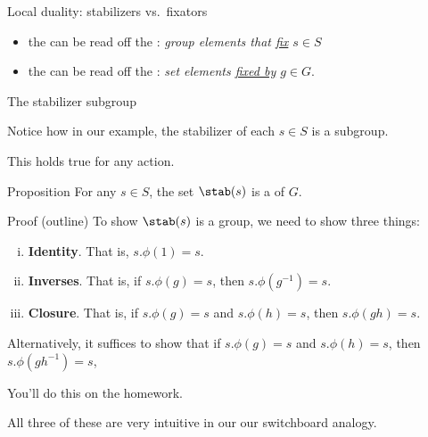 \documentclass[8pt, handout]{beamer}
\newcommand{\Pause}{}      %
\begin{document}
\begin{frame}{Local duality: stabilizers vs.\ fixators}
  \Pause
  
  \begin{itemize}
  \item the  can be read off the :
    \emph{group elements that \underline{fix} $s\in
      S$} \smallskip\Pause
  \item the  can be read off the :
    \emph{set elements \underline{fixed by} $g\in G$}.
  \end{itemize}
  
\end{frame}


\begin{frame}{The stabilizer subgroup} 

  Notice how in our example, the stabilizer of each $s\in S$ is a subgroup. 

  \medskip\Pause

  This holds true for any action. 
  
  \smallskip\Pause
  
  \begin{block}{Proposition}
    For any $s\in S$, the set $\stab(s)$ is a  of $G$.
  \end{block}

  \Pause

  \begin{exampleblock}{Proof (outline)} %
    To show $\stab(s)$ is a group, we need to show three things: \Pause \\
    \begin{enumerate}[(i)]
    \item \textbf{Identity}. That is, $s.\phi(1)=s$. \Pause \\
    \item \textbf{Inverses}. That is, if $s.\phi(g)=s$, then
      $s.\phi(g^{-1})=s$. \Pause \\
    \item \textbf{Closure}. That is, if $s.\phi(g)=s$ and
      $s.\phi(h)=s$, then $s.\phi(gh)=s$. \Pause
    \end{enumerate}
    Alternatively, it suffices to show that if $s.\phi(g)=s$ and
    $s.\phi(h)=s$, then $s.\phi(gh^{-1})=s$, \medskip

    You'll do this on the homework.
  \end{exampleblock}

  \medskip\Pause
  
  All three of these are very intuitive in our our switchboard
  analogy.
 
\end{frame}
\end{document}
